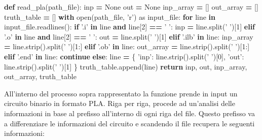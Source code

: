 \documentclass[]{book}
\newenvironment{Shaded}{\begin{snugshade}}{\end{snugshade}}
\newcommand{\BuiltInTok}[1]{#1}
\newcommand{\ControlFlowTok}[1]{\textcolor[rgb]{0.13,0.29,0.53}{\textbf{#1}}}
\newcommand{\DecValTok}[1]{\textcolor[rgb]{0.00,0.00,0.81}{#1}}
\newcommand{\ImportTok}[1]{#1}
\newcommand{\KeywordTok}[1]{\textcolor[rgb]{0.13,0.29,0.53}{\textbf{#1}}}
\newcommand{\NormalTok}[1]{#1}
\newcommand{\OperatorTok}[1]{\textcolor[rgb]{0.81,0.36,0.00}{\textbf{#1}}}
\newcommand{\StringTok}[1]{\textcolor[rgb]{0.31,0.60,0.02}{#1}}
\newcommand{\VariableTok}[1]{\textcolor[rgb]{0.00,0.00,0.00}{#1}}
\begin{document}
\begin{Shaded}
\begin{Highlighting}[]
\KeywordTok{def}\NormalTok{ read_pla(path_file):}
\NormalTok{  inp }\OperatorTok{=} \VariableTok{None}
\NormalTok{  out }\OperatorTok{=} \VariableTok{None}
\NormalTok{  inp_array }\OperatorTok{=}\NormalTok{ []}
\NormalTok{  out_array }\OperatorTok{=}\NormalTok{ []}
\NormalTok{  truth_table }\OperatorTok{=}\NormalTok{ []}
  \ControlFlowTok{with} \BuiltInTok{open}\NormalTok{(path_file, }\StringTok{'r'}\NormalTok{) }\ImportTok{as}\NormalTok{ input_file:}
    \ControlFlowTok{for}\NormalTok{ line }\KeywordTok{in}\NormalTok{ input_file.readlines():}
      \ControlFlowTok{if} \StringTok{'.i'} \KeywordTok{in}\NormalTok{ line }\KeywordTok{and}\NormalTok{ line[}\DecValTok{2}\NormalTok{] }\OperatorTok{==} \StringTok{' '}\NormalTok{:}
\NormalTok{        inp }\OperatorTok{=}\NormalTok{ line.split(}\StringTok{' '}\NormalTok{)[}\DecValTok{1}\NormalTok{]}
      \ControlFlowTok{elif} \StringTok{'.o'} \KeywordTok{in}\NormalTok{ line }\KeywordTok{and}\NormalTok{ line[}\DecValTok{2}\NormalTok{] }\OperatorTok{==} \StringTok{' '}\NormalTok{:}
\NormalTok{        out }\OperatorTok{=}\NormalTok{ line.split(}\StringTok{' '}\NormalTok{)[}\DecValTok{1}\NormalTok{]}
      \ControlFlowTok{elif} \StringTok{'.ilb'} \KeywordTok{in}\NormalTok{ line:}
\NormalTok{        inp_array }\OperatorTok{=}\NormalTok{ line.strip().split(}\StringTok{' '}\NormalTok{)[}\DecValTok{1}\NormalTok{:]}
      \ControlFlowTok{elif} \StringTok{'.ob'} \KeywordTok{in}\NormalTok{ line:}
\NormalTok{        out_array }\OperatorTok{=}\NormalTok{ line.strip().split(}\StringTok{' '}\NormalTok{)[}\DecValTok{1}\NormalTok{:]}
      \ControlFlowTok{elif} \StringTok{'.end'} \KeywordTok{in}\NormalTok{ line:}
        \ControlFlowTok{continue}
      \ControlFlowTok{else}\NormalTok{:}
\NormalTok{        line }\OperatorTok{=}\NormalTok{ \{}
          \StringTok{'inp'}\NormalTok{:  line.strip().split(}\StringTok{' '}\NormalTok{)[}\DecValTok{0}\NormalTok{],}
          \StringTok{'out'}\NormalTok{:  line.strip().split(}\StringTok{' '}\NormalTok{)[}\DecValTok{1}\NormalTok{]}
\NormalTok{        \}}
\NormalTok{        truth_table.append(line)}
  \ControlFlowTok{return}\NormalTok{ inp, out, inp_array, out_array, truth_table}
\end{Highlighting}
\end{Shaded}

All'interno del processo sopra rappresentato la funzione prende in input un circuito binario in formato PLA. Riga per riga, procede ad un'analisi delle informazioni in base al prefisso all'interno di ogni riga del file. Questo prefisso va a differenziare le informazioni del circuito e scandendo il file recupera le seguenti informazioni:
\end{document}

